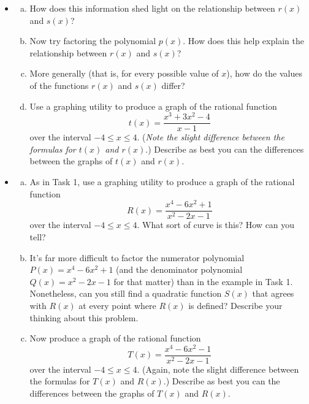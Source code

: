 \message{ !name(LHopitalsRule_2021.03.29.tex)}\documentclass[11pt]{article}
\newcounter{tasknumb}
\newcommand{\tasknumb}[1]{\refstepcounter{tasknumb}\textmd{\textbf{$\fbox{$\fbox{Task \thetasknumb}$}$}}#1}
\newenvironment{task}[1][]%
 {\begin{itemize}
 \item[\tasknumb{#1}] }
{
    \end{itemize}    }%
\begin{document}
\begin{task}[\label{factorable}]
\begin{enumerate}[(a)]
\item[] How does this information shed light on the relationship between $r(x)$ and $s(x)$? \\
\item Now try factoring the polynomial $p(x)$. How does this help explain the relationship between $r(x)$ and $s(x)$? \\
\item More generally (that is, for every possible value of $x$), how do the values of the functions $r(x)$ and $s(x)$ differ? \\
\item Use a graphing utility to produce a graph of the rational function $$t(x)=\frac{x^3+3x^2-4}{x-1}$$over the interval $-4 \le x \le 4$. (\emph{Note the slight difference between the formulas for $t(x)$ and $r(x)$}.) Describe as best you can the differences between the graphs of $t(x)$ and $r(x)$.
\end{enumerate}
\end{task}

\newpage
\begin{task}[\label{not_so_easy}]
\begin{enumerate}[(a)] \itemsep -8pt
\item As in Task 1, use a graphing utility to produce a graph of the rational function $$R(x)=\frac{x^4-6x^2+1}{x^2-2x-1}$$over the interval $-4 \le x \le 4$. What sort of curve is this? How can you tell? \\
\item It's far more difficult to factor the numerator polynomial $P(x)=x^4-6x^2+1$ (and the denominator polynomial $Q(x)=x^2-2x-1$ for that matter) than in the example in Task 1. Nonetheless, can you still find a quadratic function $S(x)$ that agrees with $R(x)$ at every point where $R(x)$ is defined? Describe your thinking about this problem. \\
\item Now produce a graph of the rational function $$T(x)=\frac{x^4-6x^2-1}{x^2-2x-1}$$ over the interval $-4 \le x \le 4$. (Again, note the slight difference between the formulas for $T(x)$ and $R(x)$.) Describe as best you can the differences between the graphs of $T(x)$ and $R(x)$.
\end{enumerate}
\end{task}
\end{document}
